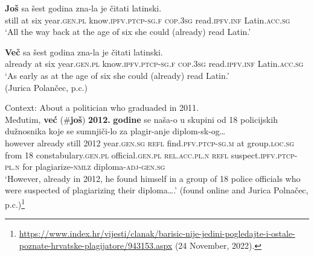 \begin{exe}
	\ex\label{exappendixBCMSTimeScalar9}
	\begin{xlist}
		\ex \gll \textbf{Još} sa šest godina zna-la je čitati latinski.\\
		still at six year.\textsc{gen}.\textsc{pl} know.\textsc{ipfv}.\textsc{ptcp}-\textsc{sg}.\textsc{f} \textsc{cop}.3\textsc{sg} 	read.\textsc{ipfv}.\textsc{inf} Latin.\textsc{acc}.\textsc{sg}\\
		\glt \lq All the way back at the age of six she could (already) read Latin.\rq
	
	\ex \gll \textbf{Več} sa šest godina zna-la je čitati latinski.\\
		already at six year.\textsc{gen}.\textsc{pl} know.\textsc{ipfv}.\textsc{ptcp}-\textsc{sg}.\textsc{f} \textsc{cop}.3\textsc{sg} 	read.\textsc{ipfv}.\textsc{inf} Latin.\textsc{acc}.\textsc{sg}\\
		\glt \lq As early as at the age of six she could (already) read Latin.\rq{ }
		\\(Jurica Polančec, p.c.)
	\end{xlist}

	\ex Context: About a politician who graduaded in 2011. \label{exappendixBCMSTimeScalar10}\\
	\gll Međutim, \textbf{već} \textup{(\#}\textbf{još}\textup{)} \textbf{2012.} \textbf{godine} se naša-o u skupini od 18 policijskih dužnosnika koje se sumnjiči-lo za plagir-anje diplom-sk-og…\\
	however already \phantom{(\#}still 2012 year.\textsc{gen}.\textsc{sg} \textsc{refl} find.\textsc{pfv}.\textsc{ptcp}-\textsc{sg}.\textsc{m} at group.\textsc{loc}.\textsc{sg} from 18 constabulary.\textsc{gen}.\textsc{pl} official.\textsc{gen}.\textsc{pl} \textsc{rel}.\textsc{acc}.\textsc{pl}.\textsc{n} \textsc{refl} suspect.\textsc{ipfv}.\textsc{ptcp}-\textsc{pl}.\textsc{n} for plagiarize-\textsc{nmlz} diploma-\textsc{adj}-\textsc{gen}.\textsc{sg}\\
	\glt \lq However, already in 2012, he found himself in a group of 18 police officials who were suspected of plagiarizing their diploma….\rq{ }(found online and Jurica Polnačec, p.c.)\footnote{\url{https://www.index.hr/vijesti/clanak/barisic-nije-jedini-pogledajte-i-ostale-poznate-hrvatske-plagijatore/943153.aspx} (24 November, 2022).}
\end{exe}

